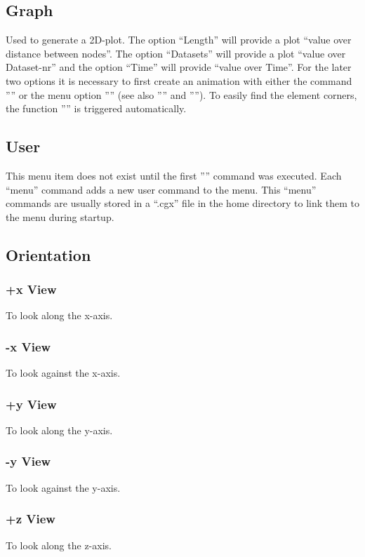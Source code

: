 \documentclass{article}
\begin{document}
\subsection{\label{Graph}Graph}
Used to generate a 2D-plot. The option ``Length'' will provide a plot ``value over distance between nodes''. The option ``Datasets'' will provide a plot ``value over Dataset-nr'' and the option ``Time'' will provide ``value over Time''. For the later two options it is necessary to first create an animation with either the command '''' or the menu option '''' (see also '''' and ''''). To easily find the element corners, the function '''' is triggered automatically.

\subsection{\label{User}User}
This menu item does not exist until the first '''' command was executed. Each ``menu'' command adds a new user command to the menu. This ``menu'' commands are usually stored in a ``.cgx'' file in the home directory to link them to the menu during startup.

\subsection{\label{Orientation}Orientation}
\subsubsection{+x View}
To look along the x-axis.
\subsubsection{-x View}
To look against the x-axis.
\subsubsection{+y View}
To look along the y-axis.
\subsubsection{-y View}
To look against the y-axis.
\subsubsection{+z View}
To look along the z-axis.
\end{document}
